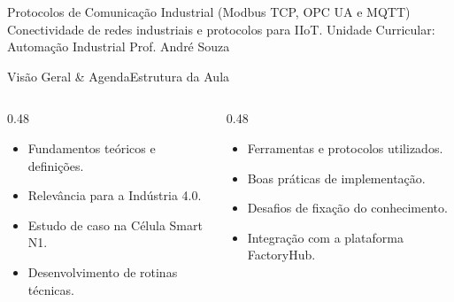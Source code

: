 
\senaicover
  {Protocolos de Comunicação Industrial (Modbus TCP, OPC UA e MQTT)}
  {Conectividade de redes industriais e protocolos para IIoT.}
  {Unidade Curricular: Automação Industrial}
  {Prof. André Souza}

\begin{senaiframe}{Visão Geral \& Agenda}{Estrutura da Aula}
  \begin{columns}[t]
    \begin{column}{0.48\textwidth}
      \begin{tcolorbox}[senaibluecard, title={1. Conceitos Chave}]
        \begin{itemize}
          \item Fundamentos teóricos e definições.
          \item Relevância para a Indústria 4.0.
        \end{itemize}
      \end{tcolorbox}
      \vspace{4pt}
      \begin{tcolorbox}[senaiambercard, title={3. Aplicação Prática}]
        \begin{itemize}
          \item Estudo de caso na Célula Smart N1.
          \item Desenvolvimento de rotinas técnicas.
        \end{itemize}
      \end{tcolorbox}
    \end{column}
    \begin{column}{0.48\textwidth}
      \begin{tcolorbox}[senairedcard, title={2. Detalhamento Técnico}]
        \begin{itemize}
          \item Ferramentas e protocolos utilizados.
          \item Boas práticas de implementação.
        \end{itemize}
      \end{tcolorbox}
      \vspace{4pt}
      \begin{tcolorbox}[senaigreencard, title={4. Exercícios \& Avaliação}]
        \begin{itemize}
          \item Desafios de fixação do conhecimento.
          \item Integração com a plataforma FactoryHub.
        \end{itemize}
      \end{tcolorbox}
    \end{column}
  \end{columns}
\end{senaiframe}

